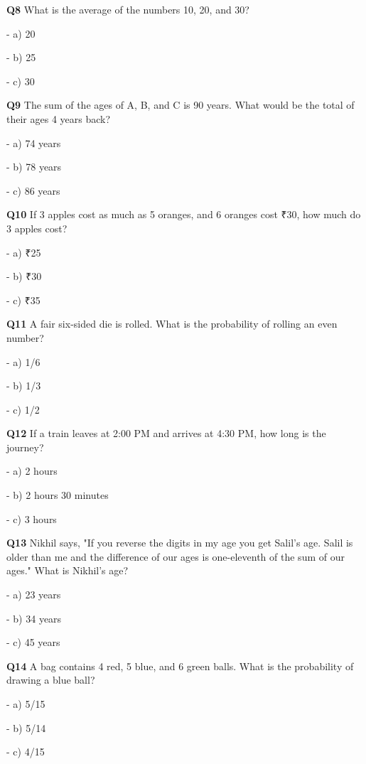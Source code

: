 \textbf{Q8} What is the average of the numbers 10, 20, and 30?\par
\quad - a) 20\par
\quad - b) 25\par
\quad - c) 30\par

\textbf{Q9} The sum of the ages of A, B, and C is 90 years. What would be the total of their ages 4 years back?\par
\quad - a) 74 years\par
\quad - b) 78 years\par
\quad - c) 86 years\par

\textbf{Q10} If 3 apples cost as much as 5 oranges, and 6 oranges cost ₹30, how much do 3 apples cost?\par
\quad - a) ₹25\par
\quad - b) ₹30\par
\quad - c) ₹35\par

\textbf{Q11} A fair six-sided die is rolled. What is the probability of rolling an even number?\par
\quad - a) 1/6\par
\quad - b) 1/3\par
\quad - c) 1/2\par

\textbf{Q12} If a train leaves at 2:00 PM and arrives at 4:30 PM, how long is the journey?\par
\quad - a) 2 hours\par
\quad - b) 2 hours 30 minutes\par
\quad - c) 3 hours\par

\textbf{Q13} Nikhil says, "If you reverse the digits in my age you get Salil's age. Salil is older than me and the difference of our ages is one-eleventh of the sum of our ages." What is Nikhil's age?\par
\quad - a) 23 years\par
\quad - b) 34 years\par
\quad - c) 45 years\par

\textbf{Q14} A bag contains 4 red, 5 blue, and 6 green balls. What is the probability of drawing a blue ball?\par
\quad - a) 5/15\par
\quad - b) 5/14\par
\quad - c) 4/15\par

